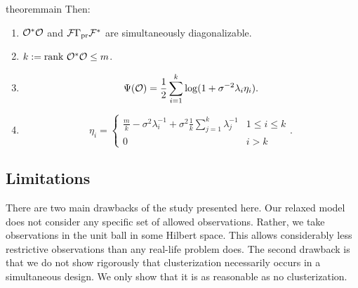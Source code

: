 \begin{restatable}{theorem}{main}
  Then:
  \begin{enumerate}
  \item $\mathcal{O}^*\mathcal{O}$ and $\mathcal{F}\Gamma_{\textup{pr}}\mathcal{F}^*$ are simultaneously
    diagonalizable.
  \item $k := \textup{rank}\  \mathcal{O}^*\mathcal{O} \leq m$.
  \item     
    \begin{equation*}
      \tar(\obs) = \frac12 \sum_{i=1}^{k} \log (1 + \sigma^{-2}\lambda_i\eta_i). %
    \end{equation*}
  \item
    \begin{equation*}
        \eta_i = \begin{cases}
          \frac{m}{k} - \sigma^2 \lambda_i^{-1} + \sigma^2 \frac{1}{k} \sum_{j=1}^k \lambda_j^{-1} & 1 \leq i \leq k \\
          0 & i > k 
        \end{cases}.
    \end{equation*}
  \end{enumerate}
\end{restatable}

\subsection{Limitations}\label{subsec:limitations}
There are two main drawbacks of the study presented here. Our relaxed
model does not consider any specific set of allowed
observations. Rather, we take observations in the unit ball in some
Hilbert space. This allows considerably less restrictive observations
than any real-life problem does. The second drawback is that we do not
show rigorously that clusterization necessarily occurs in a
simultaneous design. We only show that it is as reasonable as no
clusterization.


